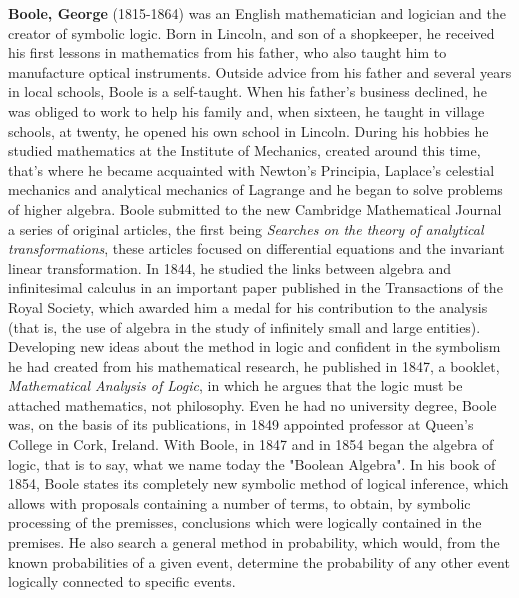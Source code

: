 \textbf{Boole, George} (1815-1864) was an English mathematician and logician and the creator of symbolic logic. Born in Lincoln, and son of a shopkeeper, he received his first lessons in mathematics from his father, who also taught him to manufacture optical instruments. Outside advice from his father and several years in local schools, Boole is a self-taught. When his father's business declined, he was obliged to work to help his family and, when sixteen, he taught in village schools, at twenty, he opened his own school in Lincoln. During his hobbies he studied mathematics at the Institute of Mechanics, created around this time, that's where he became acquainted with Newton's Principia, Laplace's celestial mechanics and analytical mechanics of Lagrange and he began to solve problems of higher algebra. Boole submitted to the new Cambridge Mathematical Journal a series of original articles, the first being \textit{Searches on the theory of analytical transformations}, these articles focused on differential equations and the invariant linear transformation. In 1844, he studied the links between algebra and infinitesimal calculus in an important paper published in the Transactions of the Royal Society, which awarded him a medal for his contribution to the analysis (that is, the use of algebra in the study of infinitely small and large entities). Developing new ideas about the method in logic and confident in the symbolism he had created from his mathematical research, he published in 1847, a booklet, \textit{Mathematical Analysis of Logic}, in which he argues that the logic must be attached mathematics, not philosophy. Even he had no university degree, Boole was, on the basis of its publications, in 1849 appointed professor at Queen's College in Cork, Ireland. With Boole, in 1847 and in 1854 began the algebra of logic, that is to say, what we name today the "Boolean Algebra". In his book of 1854, Boole states its completely new symbolic method of logical inference, which allows with proposals containing a number of terms, to obtain, by symbolic processing of the premisses, conclusions which were logically contained in the premises. He also search a general method in probability, which would, from the known probabilities of a given event, determine the probability of any other event logically connected to specific events.

